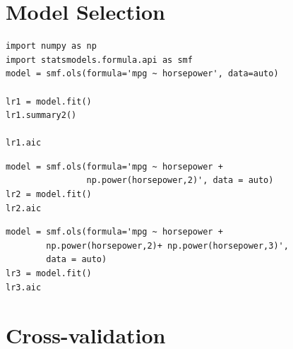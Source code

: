 
\section{Model Selection}

\begin{frame}[fragile]
\tiny
\begin{lstlisting}
import numpy as np
import statsmodels.formula.api as smf
model = smf.ols(formula='mpg ~ horsepower', data=auto)

lr1 = model.fit()
lr1.summary2()

lr1.aic 
\end{lstlisting}
\end{frame}


\begin{frame}[fragile]
\tiny
\begin{lstlisting}
model = smf.ols(formula='mpg ~ horsepower +
                np.power(horsepower,2)', data = auto)
lr2 = model.fit()
lr2.aic
\end{lstlisting}
\pause
\begin{lstlisting}
model = smf.ols(formula='mpg ~ horsepower +
		np.power(horsepower,2)+ np.power(horsepower,3)',
		data = auto)
lr3 = model.fit()
lr3.aic
\end{lstlisting}
\end{frame}


\section{Cross-validation}


